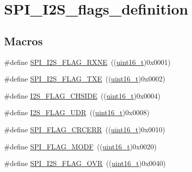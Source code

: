 \hypertarget{group___s_p_i___i2_s__flags__definition}{}\section{S\+P\+I\+\_\+\+I2\+S\+\_\+flags\+\_\+definition}
\label{group___s_p_i___i2_s__flags__definition}
\subsection*{Macros}
\begin{DoxyCompactItemize}
\item 
\#define \hyperlink{group___s_p_i___i2_s__flags__definition_ga79ee46c44f8886193293528460fea6ed}{S\+P\+I\+\_\+\+I2\+S\+\_\+\+F\+L\+A\+G\+\_\+\+R\+X\+NE}~((\hyperlink{_p_e___types_8h_a1f1825b69244eb3ad2c7165ddc99c956}{uint16\+\_\+t})0x0001)
\item 
\#define \hyperlink{group___s_p_i___i2_s__flags__definition_ga4dbac2dc3e0cfbd7a019ebecc45d66d7}{S\+P\+I\+\_\+\+I2\+S\+\_\+\+F\+L\+A\+G\+\_\+\+T\+XE}~((\hyperlink{_p_e___types_8h_a1f1825b69244eb3ad2c7165ddc99c956}{uint16\+\_\+t})0x0002)
\item 
\#define \hyperlink{group___s_p_i___i2_s__flags__definition_gaf0d629fd522a15aff188236d3254b2ad}{I2\+S\+\_\+\+F\+L\+A\+G\+\_\+\+C\+H\+S\+I\+DE}~((\hyperlink{_p_e___types_8h_a1f1825b69244eb3ad2c7165ddc99c956}{uint16\+\_\+t})0x0004)
\item 
\#define \hyperlink{group___s_p_i___i2_s__flags__definition_gaec08a8ad716bef1b87a8c8d992ab89ec}{I2\+S\+\_\+\+F\+L\+A\+G\+\_\+\+U\+DR}~((\hyperlink{_p_e___types_8h_a1f1825b69244eb3ad2c7165ddc99c956}{uint16\+\_\+t})0x0008)
\item 
\#define \hyperlink{group___s_p_i___i2_s__flags__definition_ga30fb6af50e1f3c61cb9de76b0101c889}{S\+P\+I\+\_\+\+F\+L\+A\+G\+\_\+\+C\+R\+C\+E\+RR}~((\hyperlink{_p_e___types_8h_a1f1825b69244eb3ad2c7165ddc99c956}{uint16\+\_\+t})0x0010)
\item 
\#define \hyperlink{group___s_p_i___i2_s__flags__definition_gac7d3525ab98cc18f02270a4dba685897}{S\+P\+I\+\_\+\+F\+L\+A\+G\+\_\+\+M\+O\+DF}~((\hyperlink{_p_e___types_8h_a1f1825b69244eb3ad2c7165ddc99c956}{uint16\+\_\+t})0x0020)
\item 
\#define \hyperlink{group___s_p_i___i2_s__flags__definition_ga42001f769835f133600a021a29764254}{S\+P\+I\+\_\+\+I2\+S\+\_\+\+F\+L\+A\+G\+\_\+\+O\+VR}~((\hyperlink{_p_e___types_8h_a1f1825b69244eb3ad2c7165ddc99c956}{uint16\+\_\+t})0x0040)

\end{DoxyCompactItemize}
